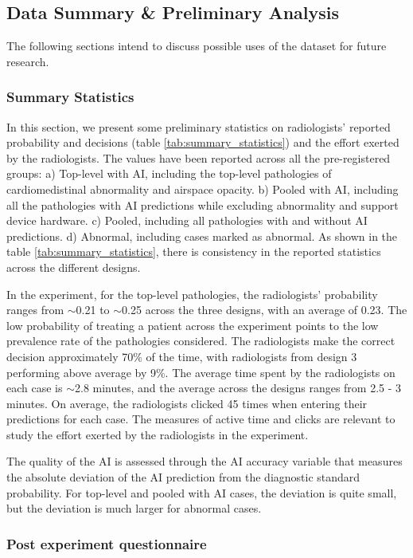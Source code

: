 \subsection*{Data Summary \& Preliminary Analysis}

The following sections intend to discuss possible uses of the dataset
for future research. 

\subsubsection*{Summary Statistics}

In this section, we present some preliminary statistics on radiologists’ reported probability and decisions (table \ref{tab:summary_statistics}) and the effort exerted by the radiologists. The values have been reported across all the pre-registered groups: a) Top-level with AI, including the top-level pathologies of cardiomedistinal abnormality and airspace opacity. b) Pooled with AI, including all the pathologies with AI predictions while excluding abnormality and support device hardware. c) Pooled, including all pathologies with and without AI predictions. d) Abnormal, including cases marked as abnormal. As shown in the table \ref{tab:summary_statistics}, there is consistency in the reported statistics across the different designs.

In the experiment, for the top-level pathologies, the radiologists’ probability ranges from $\sim$0.21 to $\sim$0.25 across the three designs, with an average of 0.23. The low probability of treating a patient across the experiment points to the low prevalence rate of the pathologies considered. The radiologists make the correct decision approximately 70\% of the time, with radiologists from design 3 performing above average by 9\%. The average time spent by the radiologists on each case is $\sim$2.8 minutes, and the average across the designs ranges from 2.5 - 3 minutes. On average, the radiologists clicked 45 times when entering their predictions for each case. The measures of active time and clicks are relevant to study the effort exerted by the radiologists in the experiment.

The quality of the AI is assessed through the AI accuracy variable that measures the absolute deviation of the AI prediction from the diagnostic standard probability. For top-level and pooled with AI cases, the deviation is quite small, but the deviation is much larger for abnormal cases.

\subsubsection*{Post experiment questionnaire}


